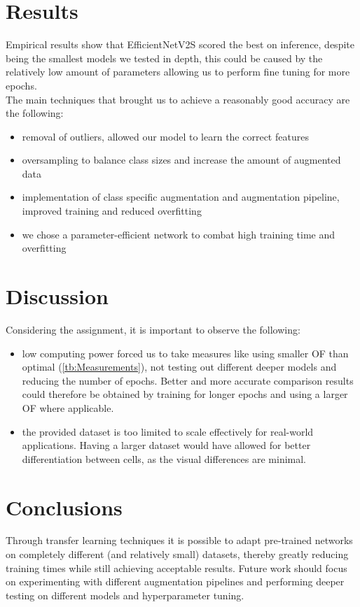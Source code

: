 \documentclass[11pt]{article}
\begin{document}
\begin{multicols}{2}
        \section{Results}
        Empirical results show that EfficientNetV2S scored the best on inference, despite being the smallest models we tested in depth, this could be caused by the relatively low amount of parameters allowing us to perform fine tuning for more epochs.
        \\
        The main techniques that brought us to achieve a reasonably good accuracy are the following:
        \begin{itemize}
            \item removal of outliers, allowed our model to learn the correct features
            \item oversampling to balance class sizes and increase the amount of augmented data
            \item implementation of class specific augmentation and augmentation pipeline, improved training and reduced overfitting
            \item we chose a parameter-efficient network to combat high training time and overfitting
        \end{itemize}

        \section{Discussion}
        Considering the assignment, it is important to observe the following: 
        \begin{itemize}
            \item low computing power forced us to take measures like using smaller OF than optimal (\ref{tb:Measurements}), not testing out different deeper models and reducing the number of epochs. Better and more accurate comparison results could therefore be obtained by training for longer epochs and using a larger OF where applicable.
            \item the provided dataset is too limited to scale effectively for real-world applications. Having a larger dataset would have allowed for better differentiation between cells, as the visual differences are minimal. 
        \end{itemize}

        \section{Conclusions}
        Through transfer learning techniques it is possible to adapt pre-trained networks on completely different (and relatively small) datasets, thereby greatly reducing training times while still achieving acceptable results.
        Future work should focus on experimenting with different augmentation pipelines and performing deeper testing on different models and hyperparameter tuning.

        
        
    
    \end{multicols}
\end{document}

